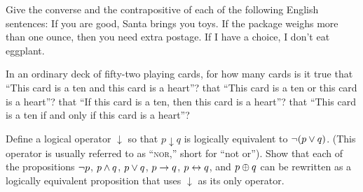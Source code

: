 \begin{exercises}
\problem Give the converse and the contrapositive of each of
the following English sentences:
\ppart If you are good, Santa brings you toys.
\ppart If the package weighs more than one ounce, then you need extra postage.
\ppart If I have a choice, I don't eat eggplant.

\problem In an ordinary deck of fifty-two playing cards, for how many cards is it true 
\ppart that ``This card is a ten and this card is a heart''?
\ppart that ``This card is a ten or this card is a heart''?
\ppart that ``If this card is a ten, then this card is a heart''?
\ppart that ``This card is a ten if and only if this card is a heart''?

\problem Define a logical operator $\downarrow$ so that
$p\downarrow q$ is logically equivalent to $\lnot(p\vee q)$.
(This operator is usually referred to as ``\textsc{nor},'' short 
for ``not or'').  Show that each of the propositions
$\lnot p$, $p\wedge q$, $p\vee q$, $p\rightarrow q$, $p\leftrightarrow q$, and
$p\oplus q$ can be rewritten as a logically equivalent proposition
that uses $\downarrow$ as its only operator.


\end{exercises}





